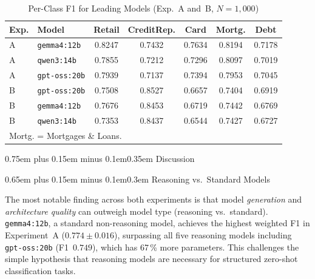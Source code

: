\documentclass[10pt,a4paper,twocolumn]{article}
\makeatletter
\renewcommand\section{\@startsection{section}{1}{0pt}%
  {0.75em plus 0.15em minus 0.1em}{0.35em}%
  {\normalfont\normalsize\itshape}}
\renewcommand\subsection{\@startsection{subsection}{2}{0pt}%
  {0.65em plus 0.15em minus 0.1em}{0.3em}%
  {\normalfont\normalsize\itshape}}
\makeatother
\begin{document}
\begin{table}[!htbp]
  \renewcommand{\arraystretch}{1.2}
  \caption{Per-Class F1 for Leading Models (Exp.~A and~B, $N{=}1{,}000$)}
  \label{tab:per_class}
  \centering
  \footnotesize
  \setlength{\tabcolsep}{2.2pt}
  \begin{tabular}{@{}llccccc@{}}
    \toprule
    \textbf{Exp.} & \textbf{Model} &
    \textbf{Retail} &
    \textbf{CreditRep.} &
    \textbf{Card} &
    \textbf{Mortg.} &
    \textbf{Debt} \\
    \midrule
    A & \texttt{gemma4:12b}      & 0.8247 & 0.7432 & 0.7634 & 0.8194 & 0.7178 \\
    A & \texttt{qwen3:14b}       & 0.7855 & 0.7212 & 0.7296 & 0.8097 & 0.7019 \\
    A & \texttt{gpt-oss:20b}     & 0.7939 & 0.7137 & 0.7394 & 0.7953 & 0.7045 \\
    \midrule
    B & \texttt{gpt-oss:20b}     & 0.7508 & 0.8527 & 0.6657 & 0.7404 & 0.6919 \\
    B & \texttt{gemma4:12b}      & 0.7676 & 0.8453 & 0.6719 & 0.7442 & 0.6769 \\
    B & \texttt{qwen3:14b}       & 0.7353 & 0.8437 & 0.6544 & 0.7427 & 0.6727 \\
    \bottomrule
    \multicolumn{7}{l}{\footnotesize Mortg. = Mortgages \& Loans.}
  \end{tabular}
\end{table}


\section{Discussion}
\label{sec:discussion}

\subsection{Reasoning vs.\ Standard Models}

The most notable finding across both experiments is that model
\emph{generation} and \emph{architecture quality} can outweigh model
type (reasoning vs.\ standard). \texttt{gemma4:12b}, a standard
non-reasoning model, achieves the highest weighted F1 in
Experiment~A ($0.774 \pm 0.016$), surpassing all five reasoning models
including \texttt{gpt-oss:20b} (F1~$0.749$), which has 67\,\% more
parameters. This challenges the simple hypothesis that reasoning models
are necessary for structured zero-shot classification tasks.
\end{document}
